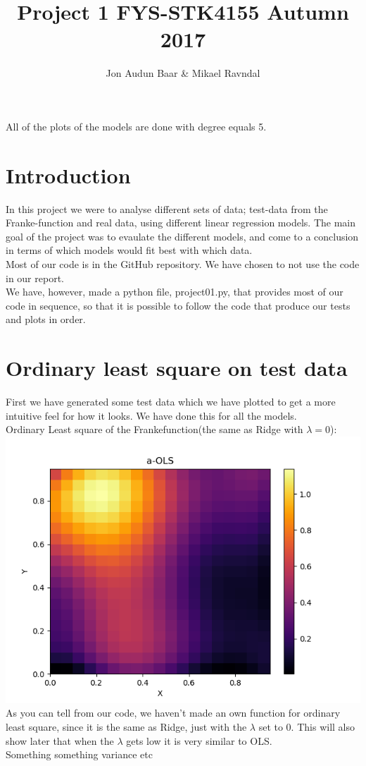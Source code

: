 \documentclass[a4paper,norsk]{article}
\title {Project 1 FYS-STK4155 Autumn 2017}
\author {Jon Audun Baar \& Mikael Ravndal}
\begin{document}
\maketitle
All of the plots of the models are done with degree equals 5.
\section*{Introduction}
In this project we were to analyse different sets of data; test-data from the Franke-function and real data, using different linear regression models. The main goal of the project was to evaulate the different models, and come to a conclusion in terms of which models would fit best with which data.
\\Most of our code is in the GitHub repository. We have chosen to not use the code in our report.
\\We have, however, made a python file, project01.py, that provides most of our code in sequence, so that it is possible to follow the code that produce our tests and plots in order.
\section*{Ordinary least square on test data}
First we have generated some test data which we have plotted to get a more intuitive feel for how it looks. We have done this for all the models.
\\Ordinary Least square of the Frankefunction(the same as Ridge with $\lambda=0$):
\\ \includegraphics[scale=.7]{a-OLS}
\\As you can tell from our code, we haven't made an own function for ordinary least square, since it is the same as Ridge, just with the $\lambda$ set to 0. This will also show later that when the $\lambda$ gets low it is very similar to OLS.
\\Something something variance etc
\end{document}

